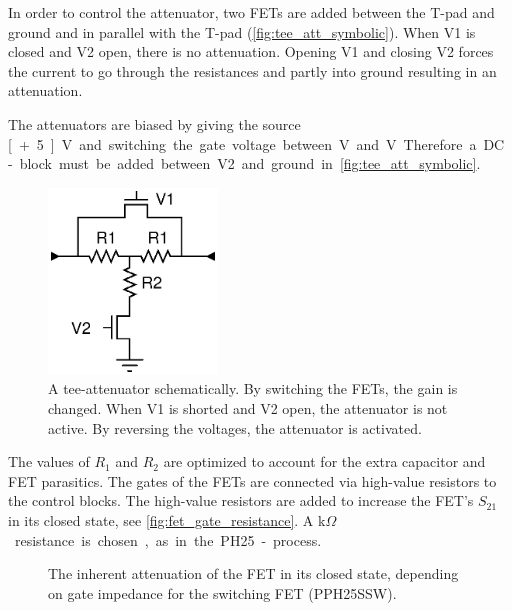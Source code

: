 		In order to control the attenuator, two FETs are added between the T-pad and ground and in parallel with the T-pad (\autoref{fig:tee_att_symbolic}). When V1 is closed and V2 open, there is no attenuation. Opening V1 and closing V2 forces the current to go through the resistances and partly into ground resulting in an attenuation.

		The attenuators are  biased by giving the source \unit[+5]{V} and switching the gate voltage between \unit[3]{V} and \unit[5]{V}. Therefore a DC-block must be added between V2 and ground in \autoref{fig:tee_att_symbolic}. 
		
		\begin{figure}[h!]
			\centering
			\includegraphics[width=0.4\textwidth]{fig/attenuators/tee-attenuator-variable-symbolic}
			\caption[A T-attenuator schematically]{A tee-attenuator schematically. By switching the FETs, the gain is changed. When V1 is shorted and V2 open, the attenuator is not active. By reversing the voltages, the attenuator is activated.}\label{fig:tee_att_symbolic}
		\end{figure}

		The values of $R_1$ and $R_2$ are optimized to account for the extra capacitor and FET parasitics. The gates of the FETs are connected via high-value resistors to the control blocks. The high-value resistors are added to increase the FET's $S_{21}$ in its closed state, see \autoref{fig:fet_gate_resistance}. A \unit[6]{k$\Omega$} resistance is chosen, as in the PH25-process. 


		\begin{figure}[h!]
			\centering
			\caption[Drain-source conductance depending on gate impedance.]{The inherent attenuation of the FET in its closed state, depending on gate impedance for the switching FET  (PPH25SSW).}\label{fig:fet_gate_resistance}
		\end{figure}		
		
